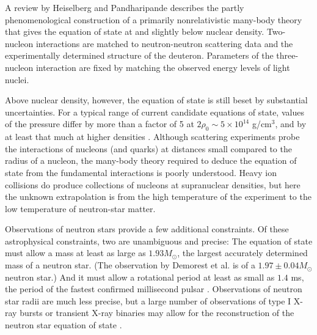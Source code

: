 \documentclass[12pt]{article}
\begin{document}
A review by Heiselberg and Pandharipande \cite{HP00} describes the
partly phenomenological construction of a primarily nonrelativistic
many-body theory that gives the equation of state at and slightly below
nuclear density.  Two-nucleon interactions are matched to
neutron-neutron scattering data and the experimentally determined
structure of the deuteron. Parameters of the three-nucleon interaction
are fixed by matching the observed energy levels of light nuclei.

Above nuclear density, however, the equation of state is still beset by
substantial uncertainties.  For a typical range of current candidate
equations of state, values of the pressure differ by more than a factor
of 5 at $2\rho_0 \sim 5\times10^{14}$ g/cm$^3$, and by at least
that much at higher densities \cite{Haensel03}.   Although scattering
experiments probe the interactions of nucleons (and quarks) at
distances small compared to the radius of a nucleon, the many-body
theory required to deduce the equation of state from the fundamental
interactions is poorly understood.  Heavy ion collisions do produce
collections of nucleons at supranuclear densities, but here the unknown
extrapolation is from the high temperature of the experiment to the low
temperature of neutron-star matter.

Observations of neutron stars provide a few additional constraints.  
Of these astrophysical constraints, two are unambiguous and precise:  
The equation of state must allow a mass at least as large as 
$1.93 M_{\odot}$, the largest accurately determined mass of a neutron star.
(The observation by Demorest et al. \cite{demorest10} is of a $1.97 \pm0.04 M_\odot$ neutron star.)
And it must allow a rotational period  
at least as small as $1.4$ ms, the period of the fastest confirmed millisecond pulsar
\cite{Hessels2006}.  
Observations of neutron star radii are much less precise, but a large number
of observations of type I X-ray bursts or transient X-ray binaries may allow 
for the reconstruction of the neutron star equation of state 
\cite{Ozel2009,Ozel2010,Steiner2010}.
\end{document}
